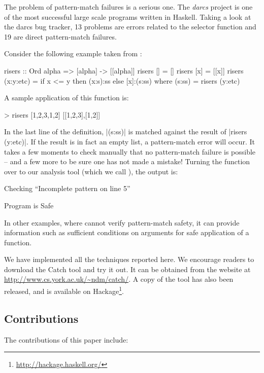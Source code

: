 The problem of pattern-match failures is a serious one. The \textit{darcs} project \citep{darcs} is one of the most successful large scale programs written in Haskell. Taking a look at the darcs bug tracker, 13 problems are errors related to the selector function  and 19 are direct pattern-match failures.

Consider the following example taken from \citet{me:catch_tfp}:

\begin{code}
risers :: Ord alpha => [alpha] -> [[alpha]]
risers [] = []
risers [x] = [[x]]
risers (x:y:etc) = if x <= y then (x:s):ss else [x]:(s:ss)
    where (s:ss) = risers (y:etc)
\end{code}

\noindent A sample application of this function is:

\ignore\begin{code}
> risers [1,2,3,1,2]
[[1,2,3],[1,2]]
\end{code}

\noindent In the last line of the definition, |(s:ss)| is matched against the result of |risers (y:etc)|. If the result is in fact an empty list, a pattern-match error will occur. It takes a few moments to check manually that no pattern-match failure is possible -- and a few more to be sure one has not made a mistake! Turning the  function over to our analysis tool (which we call \catch{}), the output is:

\smallskip
\par\noindent\textsf{Checking ``Incomplete pattern on line 5''}
\par\noindent\textsf{Program is Safe}
\smallskip

In other examples, where \catch{} cannot verify pattern-match safety, it can provide information such as sufficient conditions on arguments for safe application of a function.

We have implemented all the techniques reported here. We encourage readers to download the Catch tool and try it out. It can be obtained from the website at \url{http://www.cs.york.ac.uk/~ndm/catch/}. A copy of the tool has also been released, and is available on Hackage\footnote{\url{http://hackage.haskell.org/}}.

\subsection{Contributions}

The contributions of this paper include:

